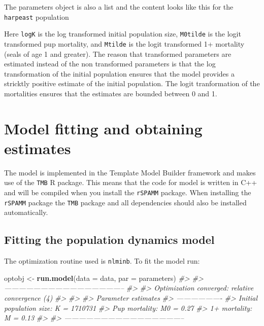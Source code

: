 \documentclass[
]{article}
\newenvironment{Shaded}{\begin{snugshade}}{\end{snugshade}}
\newcommand{\CommentTok}[1]{\textcolor[rgb]{0.56,0.35,0.01}{\textit{#1}}}
\newcommand{\DataTypeTok}[1]{\textcolor[rgb]{0.13,0.29,0.53}{#1}}
\newcommand{\KeywordTok}[1]{\textcolor[rgb]{0.13,0.29,0.53}{\textbf{#1}}}
\newcommand{\NormalTok}[1]{#1}
\newcommand{\StringTok}[1]{\textcolor[rgb]{0.31,0.60,0.02}{#1}}
\begin{document}
The parameters object is also a list and the content looks like this for
the \texttt{harpeast} population

\begin{Shaded}
\end{Shaded}

Here \texttt{logK} is the log transformed initial population size,
\texttt{M0tilde} is the logit transformed pup mortality, and
\texttt{Mtilde} is the logit transformed 1+ mortality (seals of age 1
and greater). The reason that transformed parameters are estimated
instead of the non transformed parameters is that the log transformation
of the initial population ensures that the model provides a stricktly
positive estimate of the initial population. The logit tranformation of
the mortalities ensures that the estimates are bounded between 0 and 1.

\hypertarget{model-fitting-and-obtaining-estimates}{%
\section{Model fitting and obtaining
estimates}\label{model-fitting-and-obtaining-estimates}}

The model is implemented in the Template Model Builder framework and
makes use of the \texttt{TMB} R package. This means that the code for
model is written in C++ and will be compiled when you install the
\texttt{rSPAMM} package. When installing the \texttt{rSPAMM} package the
\texttt{TMB} package and all dependencies should also be installed
automatically.

\hypertarget{fitting-the-population-dynamics-model}{%
\subsection{Fitting the population dynamics
model}\label{fitting-the-population-dynamics-model}}

The optimization routine used is \texttt{nlminb}. To fit the model run:

\begin{Shaded}
\begin{Highlighting}[]
\NormalTok{optobj <-}\StringTok{ }\KeywordTok{run.model}\NormalTok{(}\DataTypeTok{data =}\NormalTok{ data, }\DataTypeTok{par =}\NormalTok{ parameters)}
\CommentTok{#> }
\CommentTok{#> --------------------------------------------------}
\CommentTok{#> }
\CommentTok{#>  Optimization converged:  relative convergence (4) }
\CommentTok{#> }
\CommentTok{#> }
\CommentTok{#>  Parameter estimates}
\CommentTok{#>  -------------------}
\CommentTok{#>  Initial population size: K =  1710731 }
\CommentTok{#>  Pup mortality:          M0 =  0.27 }
\CommentTok{#>  1+ mortality:            M =  0.13 }
\CommentTok{#> }
\CommentTok{#> --------------------------------------------------}
\end{Highlighting}
\end{Shaded}
\end{document}
